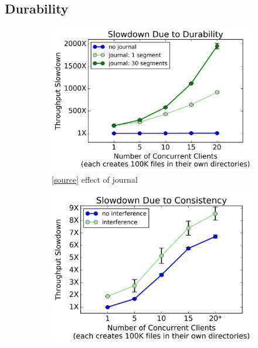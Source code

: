 \subsection{Durability}
\label{sec:durability}

\begin{figure}[t]
  \centering
  \begin{subfigure}[b]{.32\linewidth}
      \centering
      \includegraphics[width=1\linewidth]{graphs/slowdown-journal.png}
      \caption{[\href{https://github.com/michaelsevilla/cudele-popper/blob/revision/experiments/baseline-durability/visualize/viz.ipynb}{source}]
      effect of journal} \label{fig:overhead-a}
  \end{subfigure}
  \begin{subfigure}[b]{.32\linewidth}
      \centering
      \includegraphics[width=0.98\linewidth]{graphs/slowdown-interfere-scale.png}

\end{subfigure}
\end{figure}
